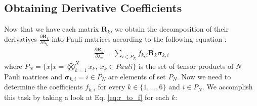 \documentclass{aux/ttuthes2007}
\newcommand{\fpd}[2]{\frac{\partial #1}{\partial #2}}
\newcommand{\elec}{N}
\begin{document}
\subsection {\textbf{Obtaining Derivative Coefficients}}
%
Now that we have each matrix $\bm R_k$, we obtain the decomposition of their derivatives $\fpd{\bm R_k}{\lambda_k}$ into Pauli matrices according to the following equation \cite{benjamin}:
%
\begin{equation}\label{eq:r_to_f}
\begin{split}
	\fpd{\bm R_k}{\lambda_k} = \sum_{i \in P_\elec} f_{k, i} \bm R_k \bm \sigma_{k, i}
\end{split}
\end{equation}
%
where $P_\elec = \{x \vert x = \bigotimes_{k = 1}^{\elec} x_k,\ x_k \in Pauli\}$ is the set of tensor products of $\elec$ Pauli matrices and $ \bm \sigma_{k, i} = i \in P_\elec$ are elements of set $P_\elec$.
Now we need to determine the coefficients $f_{k, i}$ for every $k \in \{1, \ldots, 6\}$ and $i \in P_\elec$. We accomplish this task by taking a look at Eq. \ref{eq:r_to_f} for each $k$:
%
\end{document}
